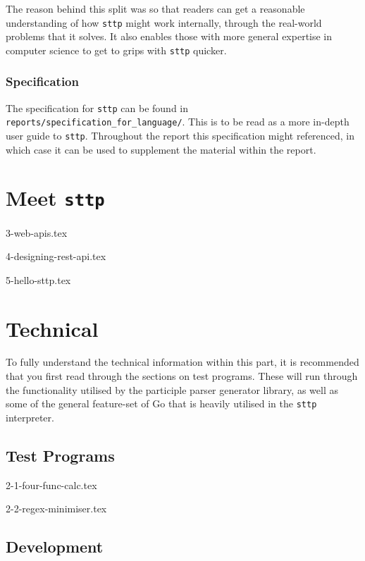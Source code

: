\documentclass[]{full}
\theoremstyle{definition}
\begin{document}
The reason behind this split was so that readers can get a reasonable understanding of how \verb|sttp| might work internally, through the real-world problems that it solves. It also enables those with more general expertise in computer science to get to grips with \verb|sttp| quicker.

\section{Specification}

The specification for \verb|sttp| can be found in \verb|reports/specification_for_language/|. This is to be read as a more in-depth user guide to \verb|sttp|. Throughout the report this specification might referenced, in which case it can be used to supplement the material within the report.

\cprotect\part{Meet \verb|sttp|}

{3-web-apis.tex}

{4-designing-rest-api.tex}

{5-hello-sttp.tex}

\part{Technical}

To fully understand the technical information within this part, it is recommended that you first read through the sections on test programs. These will run through the functionality utilised by the participle parser generator library, as well as some of the general feature-set of Go that is heavily utilised in the \verb|sttp| interpreter.

\chapter{Test Programs}
\label{chap:test-programs}

{2-1-four-func-calc.tex}

{2-2-regex-minimiser.tex}

\chapter{Development}
\label{chap:development}
\end{document}
